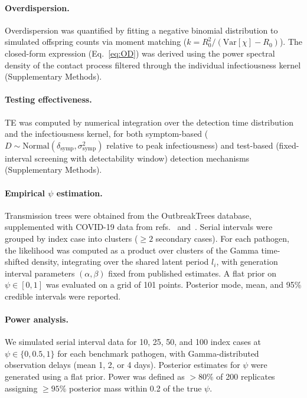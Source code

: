 \paragraph{Overdispersion.}
Overdispersion was quantified by fitting a negative binomial distribution to simulated offspring counts via moment matching ($k = R_0^2 / (\text{Var}[\chi] - R_0)$). The closed-form expression (Eq.~\ref{eq:OD}) was derived using the power spectral density of the contact process filtered through the individual infectiousness kernel (Supplementary Methods).

\paragraph{Testing effectiveness.}
TE was computed by numerical integration over the detection time distribution and the infectiousness kernel, for both symptom-based ($D \sim \text{Normal}(\delta_\text{symp}, \sigma_\text{symp}^2)$ relative to peak infectiousness) and test-based (fixed-interval screening with detectability window) detection mechanisms (Supplementary Methods).

\paragraph{Empirical $\psi$ estimation.}
Transmission trees were obtained from the OutbreakTrees database\citep{taube_outbreaktrees_2022}, supplemented with COVID-19 data from refs.~ and~. Serial intervals were grouped by index case into clusters ($\geq 2$ secondary cases). For each pathogen, the likelihood was computed as a product over clusters of the Gamma time-shifted density, integrating over the shared latent period $l_i$, with generation interval parameters $(\alpha, \beta)$ fixed from published estimates. A flat prior on $\psi \in [0,1]$ was evaluated on a grid of 101 points. Posterior mode, mean, and 95\% credible intervals were reported.

\paragraph{Power analysis.}
We simulated serial interval data for 10, 25, 50, and 100 index cases at $\psi \in \{0, 0.5, 1\}$ for each benchmark pathogen, with Gamma-distributed observation delays (mean 1, 2, or 4 days). Posterior estimates for $\psi$ were generated using a flat prior. Power was defined as $>80\%$ of 200 replicates assigning $\geq 95\%$ posterior mass within 0.2 of the true $\psi$.



















